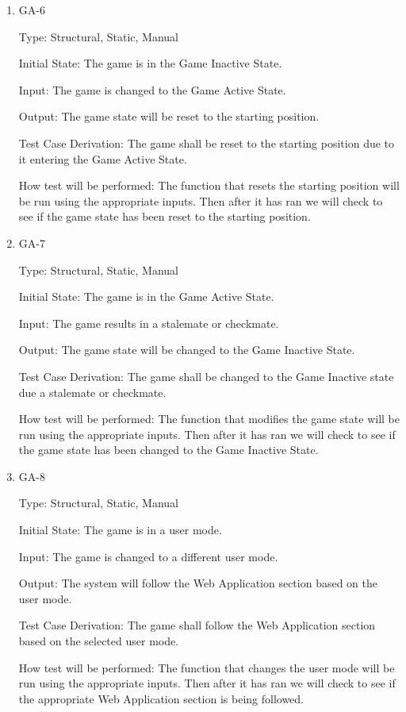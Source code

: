 \documentclass[12pt, titlepage]{article}
\begin{document}
\begin{enumerate}
\item{GA-6\\}

Type: Structural, Static, Manual
                    
Initial State: The game is in the Game Inactive State.
                    
Input: The game is changed to the Game Active State.

Output: The game state will be reset to the starting position.
                    
Test Case Derivation: The game shall be reset to the starting position due to it entering the Game Active State.

How test will be performed: The function that resets the starting position will be run using the appropriate inputs.
Then after it has ran we will check to see if the game state has been reset to the starting position.

\item{GA-7\\}

Type: Structural, Static, Manual
                    
Initial State: The game is in the Game Active State.
                    
Input: The game results in a stalemate or checkmate.

Output: The game state will be changed to the Game Inactive State.
                    
Test Case Derivation: The game shall be changed to the Game Inactive state due a stalemate or checkmate.

How test will be performed: The function that modifies the game state will be run using the appropriate inputs.
Then after it has ran we will check to see if the game state has been changed to the Game Inactive State.

\item{GA-8\\}

Type: Structural, Static, Manual
                    
Initial State: The game is in a user mode.
                    
Input: The game is changed to a different user mode.

Output: The system will follow the Web Application section based on the user mode.
                    
Test Case Derivation: The game shall follow the Web Application section based on the selected user mode.

How test will be performed: The function that changes the user mode will be run using the appropriate inputs.
Then after it has ran we will check to see if the appropriate Web Application section is being followed.


\end{enumerate}
\end{document}
